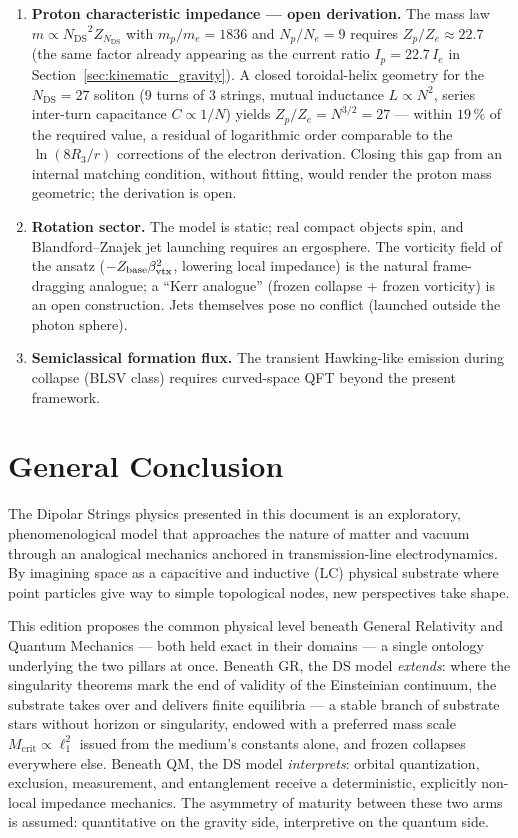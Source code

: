 \documentclass[11pt,a4paper]{article}
\theoremstyle{plain}
\theoremstyle{remark}
\newcommand{\Ncd}{\ensuremath{N_{\mathrm{DS}}}}
\begin{document}
\begin{enumerate}
    \item \textbf{Proton characteristic impedance --- open derivation.} The mass law $m \propto \Ncd^2 Z_{\Ncd}$ with $m_p/m_e = 1836$ and $N_p/N_e = 9$ requires $Z_p/Z_e \approx 22.7$ (the same factor already appearing as the current ratio $I_p = 22.7\,I_e$ in Section~\ref{sec:kinematic_gravity}). A closed toroidal-helix geometry for the $\Ncd = 27$ soliton (9 turns of 3 strings, mutual inductance $L \propto N^2$, series inter-turn capacitance $C \propto 1/N$) yields $Z_p/Z_e = N^{3/2} = 27$ --- within $19\,\%$ of the required value, a residual of logarithmic order comparable to the $\ln(8R_3/r)$ corrections of the electron derivation. Closing this gap from an internal matching condition, without fitting, would render the proton mass geometric; the derivation is open.
    \item \textbf{Rotation sector.} The model is static; real compact objects spin, and Blandford--Znajek jet launching requires an ergosphere. The vorticity field of the ansatz ($-Z_{\rm base}\beta^2_{\rm vtx}$, lowering local impedance) is the natural frame-dragging analogue; a ``Kerr analogue'' (frozen collapse + frozen vorticity) is an open construction. Jets themselves pose no conflict (launched outside the photon sphere).
    \item \textbf{Semiclassical formation flux.} The transient Hawking-like emission during collapse (BLSV class) requires curved-space QFT beyond the present framework.
\end{enumerate}

\section{General Conclusion}
The Dipolar Strings physics presented in this document is an exploratory, phenomenological model that approaches the nature of matter and vacuum through an analogical mechanics anchored in transmission-line electrodynamics. By imagining space as a capacitive and inductive (LC) physical substrate where point particles give way to simple topological nodes, new perspectives take shape.

This edition proposes the common physical level beneath General Relativity and Quantum Mechanics --- both held exact in their domains --- a single ontology underlying the two pillars at once. Beneath GR, the DS model \emph{extends}: where the singularity theorems mark the end of validity of the Einsteinian continuum, the substrate takes over and delivers finite equilibria --- a stable branch of substrate stars without horizon or singularity, endowed with a preferred mass scale $M_{\text{crit}} \propto \ell_1^2$ issued from the medium's constants alone, and frozen collapses everywhere else. Beneath QM, the DS model \emph{interprets}: orbital quantization, exclusion, measurement, and entanglement receive a deterministic, explicitly non-local impedance mechanics. The asymmetry of maturity between these two arms is assumed: quantitative on the gravity side, interpretive on the quantum side.
\end{document}
